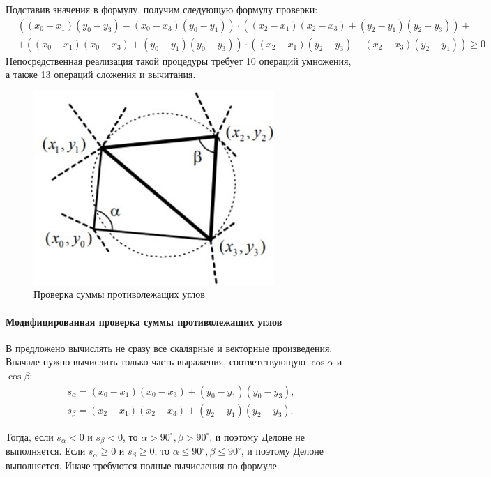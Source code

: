 \documentclass{fefu}
\begin{document}
Подставив значения в формулу, получим следующую формулу проверки:
\small
\begin{equation*}
    \begin{split}
        & \left((x_0 - x_1)(y_0 - y_3) - (x_0 - x_3)(y_0 - y_1)\right)\cdot \left((x_2 - x_1)(x_2 - x_3) + (y_2 - y_1)(y_2 - y_3) \right) + \\
        & + \left((x_0 - x_1)(x_0 - x_3) + (y_0 - y_1)(y_0 - y_3)\right)\cdot \left((x_2 - x_1)(y_2 - y_3) - (x_2-x_3)(y_2 - y_1)\right)\geq 0
    \end{split}
\end{equation*}
\normalsize
Непосредственная реализация такой процедуры требует 10 операций умножения, а также 13 операций сложения и вычитания.
\begin{figure}[H]
    \centering
    \includegraphics{images/OppositeAngles.jpg}
    \caption{Проверка суммы противолежащих углов}
\end{figure}
\paragraph{Модифицированная проверка суммы противолежащих углов}
В \cite{ModifiedOppositeAngles} предложено вычислять не сразу все скалярные и векторные произведения. Вначале нужно
вычислить только часть выражения, соответствующую $\cos \alpha$ и $\cos \beta$:
\begin{equation*}
    \begin{split}
        s_\alpha = (x_0 - x_1)(x_0 - x_3) + (y_0 - y_1)(y_0 - y_3),\\
        s_\beta = (x_2 - x_1)(x_2 - x_3) + (y_2 - y_1)(y_2 - y_3).
    \end{split}
\end{equation*}

Тогда, если $s_\alpha < 0$ и $s_\beta < 0$, то $\alpha > 90^\circ, \beta > 90^\circ$, и поэтому Делоне не выполняется.
Если $s_\alpha \geq 0$ и $s_\beta \geq 0$, то $\alpha \leq 90^\circ, \beta \leq 90^\circ$, и поэтому Делоне выполняется.
Иначе требуются полные вычисления по формуле.
\end{document}
